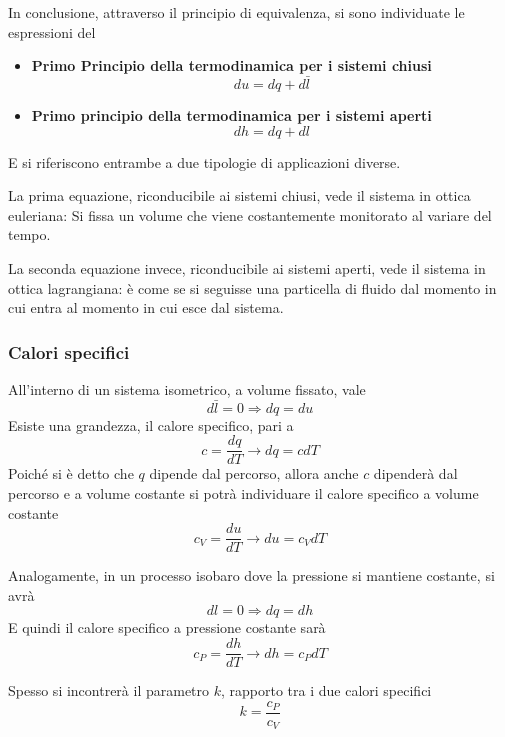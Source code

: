 \begin{adjustwidth}{2in}{}
	\vspace{0.5cm}
	
	In conclusione, attraverso il principio di equivalenza, si sono individuate le espressioni del
	\begin{itemize}
		\item \textbf{Primo Principio della termodinamica per i sistemi chiusi}
		\[du = dq + d\bar{l}\]
		\item \textbf{Primo principio della termodinamica per i sistemi aperti}
		\[dh = dq+dl\]
	\end{itemize}
	E si riferiscono entrambe a due tipologie di applicazioni diverse. 
	
	La prima equazione, riconducibile ai sistemi chiusi, vede il sistema in  ottica euleriana: Si fissa un volume che viene costantemente monitorato al variare del tempo.
	
	La seconda equazione invece, riconducibile ai sistemi aperti, vede il sistema  in ottica lagrangiana: è come se si seguisse una particella di fluido dal momento in cui entra al momento in cui esce dal sistema.
	
	\subsubsection{Calori specifici}
	
	All'interno di un sistema isometrico, a volume fissato, vale
	\[d\bar{l} = 0\Rightarrow dq = du \] 
	Esiste una grandezza, il calore specifico, pari a 
	\[c = \dfrac{dq}{dT} \rightarrow dq = cdT\]
	Poiché si è detto che $q$ dipende dal percorso, allora anche $c$ dipenderà dal percorso e a volume costante si potrà individuare il calore specifico a volume costante 
	\begin{equation}\label{eq:1.7}
		\boxed{c_V = \dfrac{du}{dT} \rightarrow du = c_VdT}
	\end{equation}
		
	Analogamente, in un processo isobaro dove la pressione si mantiene costante, si avrà 
	\[dl = 0\Rightarrow dq = dh \] 
	E quindi il calore specifico a pressione costante sarà
	\begin{equation}\label{eq:1.8}
		\boxed{c_P = \dfrac{dh}{dT} \rightarrow dh = c_PdT}
	\end{equation}
	
	Spesso si incontrerà il parametro $k$, rapporto tra i due calori specifici
	\begin{equation} \label{eq:1.9}
		\boxed{k = \dfrac{c_P}{c_V}}
	\end{equation}
	

\end{adjustwidth}
